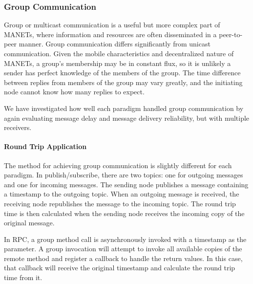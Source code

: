 \subsubsection{Group Communication}

Group or multicast communication is a useful but more complex part of MANETs, where information and resources are often disseminated in a peer-to-peer manner. Group communication differs significantly from unicast communication. Given the mobile characteristics and decentralized nature of MANETs, a group's membership may be in constant flux, so it is unlikely a sender has perfect knowledge of the members of the group. The time difference between replies from members of the group may vary greatly, and the initiating node cannot know how many replies to expect.

We have investigated how well each paradigm handled group communication by again evaluating message delay and message delivery reliability, but with multiple receivers.

\paragraph{Round Trip Application}\label{sec:rtapp}

The method for achieving group communication is slightly different for each paradigm. In publish/subscribe, there are two topics: one for outgoing messages and one for incoming messages. The sending node publishes a message containing a timestamp to the outgoing topic. When an outgoing message is received, the receiving node republishes the message to the incoming topic. The round trip time is then calculated when the sending node receives the incoming copy of the original message.

In RPC, a group method call is asynchronously invoked with a timestamp as the parameter. A group invocation will attempt to invoke all available copies of the remote method and register a callback to handle the return values. In this case, that callback will receive the original timestamp and calculate the round trip time from it.

